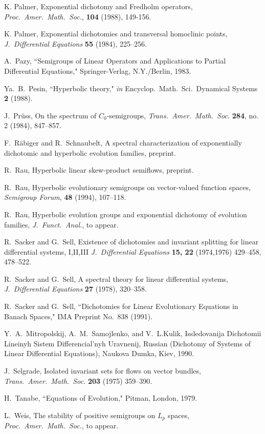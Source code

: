 \begin{thebibliography}{99}
 K. Palmer,
Exponential dichotomy and Fredholm operators,
{\em Proc.~Amer.~Math.~Soc.},
{\bf 104} (1988), 149-156.

 K. Palmer,
Exponential dichotomies and transversal homoclinic points,
{\em J.~Differential Equations}
{\bf 55} (1984), 225--256.

 A.~Pazy,
``Semigroups of Linear Operators and Applications to Partial
Differential Equations,"
Springer-Verlag, N.Y./Berlin, 1983.

  Ya.~B.~Pesin,
``Hyperbolic theory,"
{\em in} Encyclop.~Math.~Sci.~Dynamical Systems {\bf 2} (1988).

 J.~Pr\"uss,
On the spectrum of $C_0$-semigroups,
{\em Trans.~Amer.~Math.~Soc.}
{\bf  284}, no. 2 (1984), 847--857.

 F.~R\"{a}biger and R.~Schnaubelt,
A spectral characterization of exponentially dichotomic and hyperbolic
evolution families,
preprint.

  R.~Rau,
Hyperbolic linear skew-product semiflows,
preprint.

  R.~Rau,
Hyperbolic evolutionary semigroups on vector-valued function spaces,
{\em Semigroup Forum},
{\bf 48} (1994), 107--118.

 R.~Rau,
Hyperbolic evolution groups and exponential dichotomy of evolution
families,
{\em J.~Funct.~Anal.}, to appear.

 R.~Sacker and G.~Sell,
Existence of dichotomies and invariant splitting for linear
differential systems, I,II,III
{\em J.~Differential Equations}
{\bf 15, 22} (1974,1976) 429--458, 478--522.

  R.~Sacker and G.~Sell,
A spectral theory for linear differential systems,
{\em J.~Differential Equations}
{\bf  27} (1978), 320--358.

 R.~Sacker and G.~Sell,
``Dichotomies for Linear Evolutionary Equations in Banach Spaces,"
IMA Preprint No.~838 (1991).

 Y.~A.~Mitropolskij, A.~M.~Samojlenko, and V.~L.Kulik,
Issledovanija Dichotomii Lineinyh Sistem  Differencial'nyh Uravnenij,
Russian (Dichotomy of Systems of Linear Differential Equations),
Naukova Dumka, Kiev, 1990.

 J.~Selgrade,
Isolated invariant sets for flows on vector bundles,
{\em Trans.~Amer.~Math.~Soc.}
{\bf 203} (1975) 359--390.

  H.~Tanabe,
``Equations of Evolution,"
Pitman, London, 1979.

 L.~Weis,
The stability of positive semigroups on $L_p$ spaces,
{\em Proc.~Amer.~Math.~Soc.}, to appear.

\end{thebibliography}









